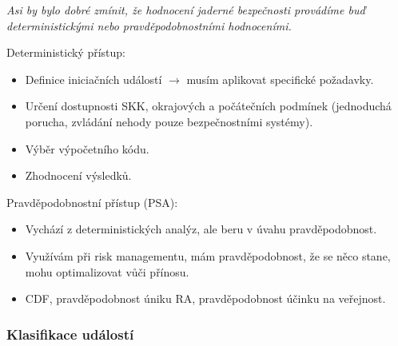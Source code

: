 \textit{Asi by bylo dobré zmínit, že hodnocení jaderné bezpečnosti provádíme buď deterministickými nebo pravděpodobnostními hodnoceními.}

Deterministický přístup:

\begin{itemize}
    \item Definice iniciačních událostí $\rightarrow$ musím aplikovat specifické požadavky.
    \item Určení dostupnosti SKK, okrajových a počátečních podmínek (jednoduchá porucha, zvládání nehody pouze bezpečnostními systémy).
    \item Výběr výpočetního kódu.
    \item Zhodnocení výsledků.
\end{itemize}

Pravděpodobnostní přístup (PSA):

\begin{itemize}
    \item Vychází z deterministických analýz, ale beru v úvahu pravděpodobnost.
    \item Využívám při risk managementu, mám pravděpodobnost, že se něco stane, mohu optimalizovat vůči přínosu.
    \item CDF, pravděpodobnost úniku RA, pravděpodobnost účinku na veřejnost.
\end{itemize}

\subsubsection{Klasifikace událostí}

